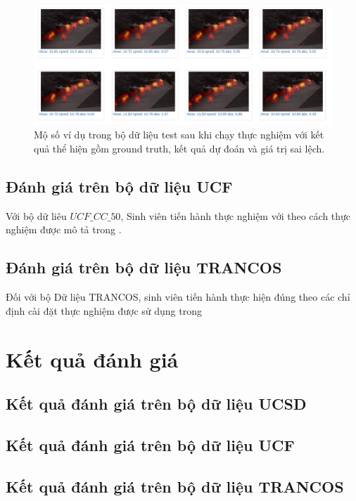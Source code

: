 \begin{figure}[ht]
  			\begin{center}
    				\includegraphics[scale=0.35]{ucsd} 
    				\caption{Mộ số ví dụ trong bộ dữ liệu test sau khi chạy thực nghiệm với kết quả thể hiện gồm ground truth, kết quả dự đoán và giá trị sai lệch.}
    				\label{ucsd}
  			\end{center}
\end{figure}	  
	

\subsection{Đánh giá trên bộ dữ liệu UCF} 
	Với bộ dữ liêu $UCF\_CC\_50$, Sinh viên tiến hành thực nghiệm với theo cách thực nghiệm được mô tả trong \cite{idrees2013multi}. 
		
\subsection{Đánh giá trên bộ dữ liệu TRANCOS}
	Đối với bộ Dữ liệu TRANCOS, sinh viên tiến hành thực hiện đúng theo các chỉ định cài đặt thực nghiệm được sử dụng trong 
\section{Kết quả đánh giá}

\subsection{Kết quả đánh giá trên bộ dữ liệu UCSD}

\subsection{Kết quả đánh giá trên bộ dữ liệu UCF} 

\subsection{Kết quả đánh giá trên bộ dữ liệu TRANCOS}